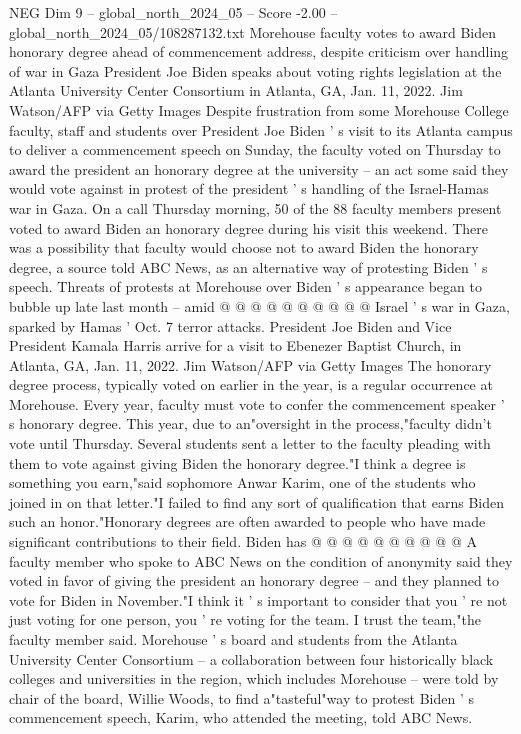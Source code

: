 \begin{textsample}{NEG Dim 9 – global\_north\_2024\_05 – Score -2.00 – global\_north\_2024\_05/108287132.txt}  \label{ex:f9_neg_158}
Morehouse faculty votes to award Biden honorary degree ahead of commencement address, despite criticism over handling of war in Gaza President Joe Biden speaks about voting rights legislation at the Atlanta University Center Consortium in Atlanta, GA, Jan. 11, 2022.
Jim Watson/AFP via Getty Images Despite frustration from some Morehouse College faculty, staff and students over President Joe Biden ' s visit to its Atlanta campus to deliver a commencement speech on Sunday, the faculty voted on Thursday to award the president an honorary degree at the university -- an act some said they would vote against in protest of the president ' s handling of the Israel-Hamas war in Gaza.
On a call Thursday morning, 50 of the 88 faculty members present voted to award Biden an honorary degree during his visit this weekend.
There was a possibility that faculty would choose not to award Biden the honorary degree, a source told ABC News, as an alternative way of protesting Biden ' s speech.
Threats of protests at Morehouse over Biden ' s appearance began to bubble up late last month -- amid @ @ @ @ @ @ @ @ @ @ Israel ' s war in Gaza, sparked by Hamas ' Oct. 7 terror attacks.
President Joe Biden and Vice President Kamala Harris arrive for a visit to Ebenezer Baptist Church, in Atlanta, GA, Jan. 11, 2022.
Jim Watson/AFP via Getty Images The honorary degree process, typically voted on earlier in the year, is a regular occurrence at Morehouse.
Every year, faculty must vote to confer the commencement speaker ' s honorary degree.
This year, due to an"oversight in the process,"faculty didn't vote until Thursday.
Several students sent a letter to the faculty pleading with them to vote against giving Biden the honorary degree."I think a degree is something you earn,"said sophomore Anwar Karim, one of the students who joined in on that letter."I failed to find any sort of qualification that earns Biden such an honor."Honorary degrees are often awarded to people who have made significant contributions to their field.
Biden has @ @ @ @ @ @ @ @ @ @ A faculty member who spoke to ABC News on the condition of anonymity said they voted in favor of giving the president an honorary degree -- and they planned to vote for Biden in November."I think it ' s important to consider that you ' re not just voting for one person, you ' re voting for the team.
I trust the team,"the faculty member said.
Morehouse ' s board and students from the Atlanta University Center Consortium -- a collaboration between four historically black colleges and universities in the region, which includes Morehouse -- were told by chair of the board, Willie Woods, to find a"tasteful"way to protest Biden ' s commencement speech, Karim, who attended the meeting, told ABC News.

\end{textsample}
